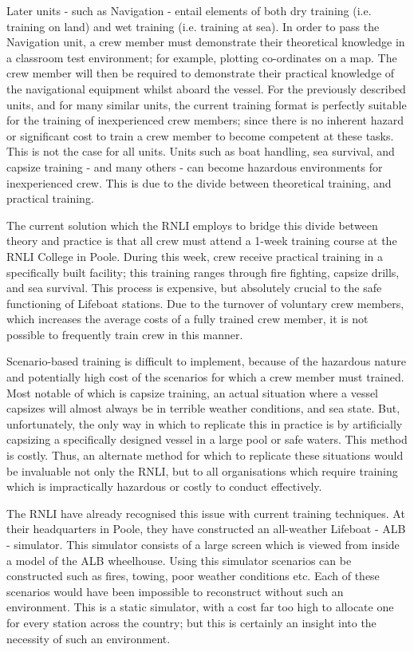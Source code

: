 \documentclass[ %
                    author={Elis Jones},
                supervisor={Dr. Kirsten Cater},
                    degree={BSc},
                     title={The Effect of Presentation Medium on Spatial Cognition},
                  subtitle={in the Virtual Environment},
                      year={2018} ]{dissertation}
\begin{document}
Later units - such as Navigation - entail elements of both dry training (i.e. training on land) and wet training (i.e. training at sea). In order to pass the Navigation unit, a crew member must demonstrate their theoretical knowledge in a classroom test environment; for example, plotting co-ordinates on a map. The crew member will then be required to demonstrate their practical knowledge of the navigational equipment whilst aboard the vessel. 
For the previously described units, and for many similar units, the current training format is perfectly suitable for the training of inexperienced crew members; since there is no inherent hazard or significant cost to train a crew member to become competent at these tasks. This is not the case for all units. Units such as boat handling, sea survival, and capsize training - and many others - can become hazardous environments for inexperienced crew. This is due to the divide between theoretical training, and practical training. 

The current solution which the RNLI employs to bridge this divide between theory and practice is that all crew must attend a 1-week training course at the RNLI College in Poole. During this week, crew receive practical training in a specifically built facility; this training ranges through fire fighting, capsize drills, and sea survival. This process is expensive, but absolutely crucial to the safe functioning of Lifeboat stations. Due to the turnover of voluntary crew members, which increases the average costs of a fully trained crew member, it is not possible to frequently train crew in this manner. 

Scenario-based training is difficult to implement, because of the hazardous nature and potentially high cost of the scenarios for which a crew member must trained. Most notable of which is capsize training, an actual situation where a vessel capsizes will almost always be in terrible weather conditions, and sea state. But, unfortunately, the only way in which to replicate this in practice is by artificially capsizing a specifically designed vessel in a large pool or safe waters. This method is costly. Thus, an alternate method for which to replicate these situations would be invaluable not only the RNLI, but to all organisations which require training which is impractically hazardous or costly to conduct effectively.

The RNLI have already recognised this issue with current training techniques. At their headquarters in Poole, they have constructed an all-weather Lifeboat - ALB - simulator. This simulator consists of a large screen which is viewed from inside a model of the ALB wheelhouse. Using this simulator scenarios can be constructed such as fires, towing, poor weather conditions etc. Each of these scenarios would have been impossible to reconstruct without such an environment. This is a static simulator, with a cost far too high to allocate one for every station across the country; but this is certainly an insight into the necessity of such an environment.
\end{document}
